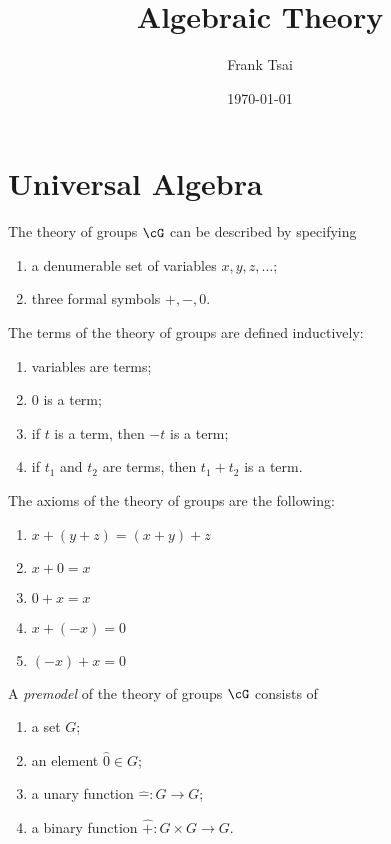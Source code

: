 \documentclass{amsart}
\title{Algebraic Theory}
\author{Frank Tsai}
\date{\today}
\begin{document}
\maketitle
\tableofcontents

\newcommand{\interp}[1]{\llbracket #1 \rrbracket}

\section{Universal Algebra}
\label{sec:universal-algebra}

The theory of groups $\cG$ can be described by specifying
\begin{enumerate}
\item a denumerable set of variables $x, y, z, \ldots$;
\item three formal symbols $+, -, 0$.
\end{enumerate}

The terms of the theory of groups are defined inductively:
\begin{enumerate}
\item variables are terms;
\item $0$ is a term;
\item if $t$ is a term, then $-t$ is a term;
\item if $t_{1}$ and $t_{2}$ are terms, then $t_{1} + t_{2}$ is a term.
\end{enumerate}

The axioms of the theory of groups are the following:
\begin{enumerate}
\item $x + (y + z) = (x + y) + z$
\item $x + 0 = x$
\item $0 + x = x$
\item $x + (-x) = 0$
\item $(-x) + x = 0$
\end{enumerate}

\begin{defn}
  A \emph{premodel} of the theory of groups $\cG$ consists of
  \begin{enumerate}
  \item a set $G$;
  \item an element $\hat{0} \in G$;
  \item a unary function $\hat{-} : G \to G$;
  \item a binary function $\hat{+} : G \times G \to G$.
  \end{enumerate}
\end{defn}
\end{document}
